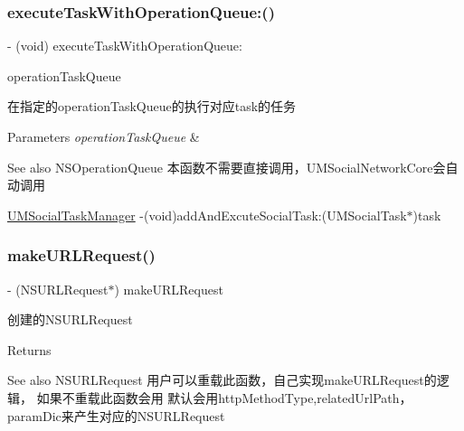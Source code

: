 \subsubsection{\texorpdfstring{execute\+Task\+With\+Operation\+Queue\+:()}{executeTaskWithOperationQueue:()}\hspace{0.1cm}{\footnotesize\ttfamily [2/2]}}
{\footnotesize\ttfamily -\/ (void) execute\+Task\+With\+Operation\+Queue\+: \begin{DoxyParamCaption}\item[{(N\+S\+Operation\+Queue $\ast$)}]{operation\+Task\+Queue }\end{DoxyParamCaption}}

在指定的operation\+Task\+Queue的执行对应task的任务


\begin{DoxyParams}{Parameters}
{\em operation\+Task\+Queue} & \\
\hline
\end{DoxyParams}
\begin{DoxySeeAlso}{See also}
N\+S\+Operation\+Queue  本函数不需要直接调用，\+U\+M\+Social\+Network\+Core会自动调用 

\mbox{\hyperlink{interface_u_m_social_task_manager}{U\+M\+Social\+Task\+Manager}} -\/(void)add\+And\+Excute\+Social\+Task\+:(\+U\+M\+Social\+Task$\ast$)task 
\end{DoxySeeAlso}
\mbox{\label{interface_u_m_social_task_a632c408ac0132dedcf3428e65d4a0010}} 
\subsubsection{\texorpdfstring{make\+U\+R\+L\+Request()}{makeURLRequest()}\hspace{0.1cm}{\footnotesize\ttfamily [1/2]}}
{\footnotesize\ttfamily -\/ (N\+S\+U\+R\+L\+Request$\ast$) make\+U\+R\+L\+Request \begin{DoxyParamCaption}{ }\end{DoxyParamCaption}}

创建的\+N\+S\+U\+R\+L\+Request

\begin{DoxyReturn}{Returns}

\end{DoxyReturn}
\begin{DoxySeeAlso}{See also}
N\+S\+U\+R\+L\+Request  用户可以重载此函数，自己实现make\+U\+R\+L\+Request的逻辑， 如果不重载此函数会用 默认会用http\+Method\+Type,related\+Url\+Path，param\+Dic来产生对应的\+N\+S\+U\+R\+L\+Request 
\end{DoxySeeAlso}
\mbox{\label{interface_u_m_social_task_a632c408ac0132dedcf3428e65d4a0010}} 
